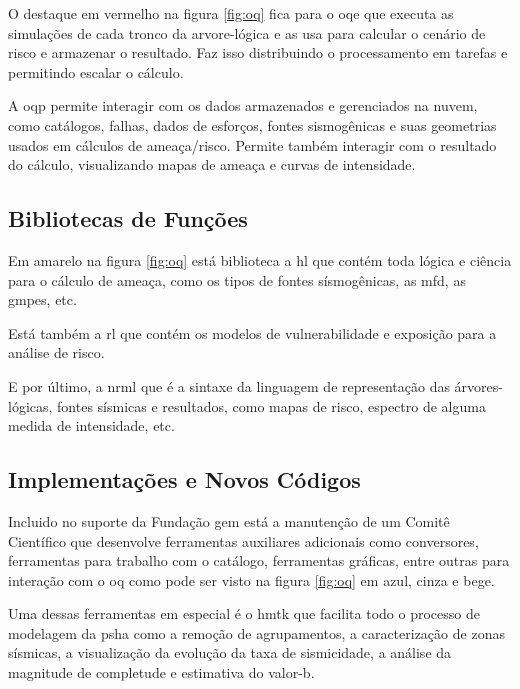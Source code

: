 O destaque em vermelho na figura \ref{fig:oq} fica para o \gls{oqe} que executa as simulações de cada tronco da
arvore-lógica e as usa para calcular o cenário de risco e armazenar o resultado.
Faz isso distribuindo o processamento em tarefas e permitindo escalar o cálculo.

A \gls{oqp} permite interagir com os dados armazenados e gerenciados na nuvem, como catálogos, 
falhas, dados de esforços, fontes sismogênicas e suas geometrias usados em cálculos de ameaça/risco.
Permite também interagir com o resultado do cálculo, visualizando mapas de ameaça e curvas de intensidade.

\subsection{Bibliotecas de Funções}
\label{sec:bibliotecas}

Em amarelo na figura \ref{fig:oq} está biblioteca a \gls{hl} que contém toda lógica e ciência para o cálculo de ameaça,
como os tipos de fontes sísmogênicas, as \gls{mfd}, as \glspl{gmpe}, etc. 

Está também a \gls{rl}
que contém os modelos de vulnerabilidade e exposição para a análise de risco. 

E por último,
a \gls{nrml} que é a sintaxe da linguagem de representação das árvores-lógicas, fontes sísmicas e
resultados, como mapas de risco, espectro de alguma medida de intensidade, etc. 


\subsection{Implementações e Novos Códigos}
\label{sec:implementacao}

Incluido no suporte da Fundação \gls{gem} está a manutenção de um Comitê Científico
que desenvolve ferramentas auxiliares adicionais como conversores, ferramentas para trabalho com 
o catálogo, ferramentas gráficas, entre outras para interação com o
\gls{oq} como pode ser visto na figura \ref{fig:oq} em azul, cinza e bege.

Uma dessas ferramentas em especial é o \gls{hmtk} que facilita todo o processo de modelagem da \gls{psha}
como a remoção de agrupamentos, a caracterização de zonas sísmicas,  
a visualização da evolução da taxa de sismicidade, a análise da magnitude de completude e
estimativa do valor-b.

